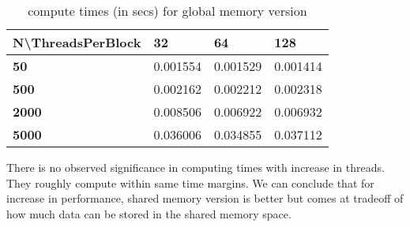 \begin{table}[h]
\centering
\begin{tabular}{@{}llll@{}}
  \textbf{N\textbackslash{}ThreadsPerBlock} & \textbf{32} & \textbf{64} & \textbf{128} \\
  \hline
\textbf{50}                               & 0.001554    & 0.001529    & 0.001414     \\
\textbf{500}                              & 0.002162    & 0.002212    & 0.002318     \\
\textbf{2000}                             & 0.008506    & 0.006922    & 0.006932     \\
\textbf{5000}                             & 0.036006    & 0.034855    & 0.037112    
\end{tabular}
\caption{compute times (in secs) for global memory version}
\label{tab:glb}
\end{table}
There is no observed significance in computing times with increase in threads. They roughly compute within same time margins. We can conclude that for increase in performance, shared memory version is better but comes at tradeoff of how much data can be stored in the shared memory space. 

